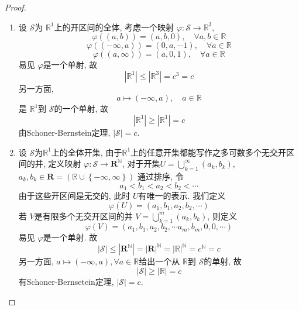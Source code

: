 \documentclass[../main.tex]{subfiles}
\begin{document}
\begin{proof}
    \begin{enumerate}
        \item 设 \(  \mathcal{S}  \)为 \(  \mathbb{R} ^{1}  \)上的开区间的全体, 考虑一个映射 \(   \varphi :\mathcal{S}\to \mathbb{R} ^{3}  \), \[
         \varphi \left( \left( a,b \right)  \right)= \left( a,b,0 \right),\quad \forall a,b\in \mathbb{R}   
        \]    \[
         \varphi \left( \left( -\infty,a  \right) \right)= \left( 0, a,-1 \right),\quad \forall a \in \mathbb{R}   
        \] \[
         \varphi \left(\left(  a, \infty \right)  \right)= \left( a,0 ,1 \right) ,\quad \forall  a \in \mathbb{R}  
        \]易见 \(   \varphi   \)是一个单射, 故 \[
        \left| \mathbb{R} ^{1} \right|\le \left| \mathbb{R} ^{3} \right|= c^{3}= c  
        \] 另一方面,  \[
        a\mapsto  \left( -\infty,a \right),\quad a\in \mathbb{R}  
        \]是 \(  \mathbb{R} ^{1}  \)到 \(  \mathcal{S}  \)的一个单射, 故 \[
        \left| \mathbb{R} ^{1} \right|\ge \left| \mathbb{R} ^{1}\right|= c  
        \]  由Schoner-Bernstein定理, \(  \left| \mathcal{S} \right|= c   \).
        
        \item 设 \(  \mathcal{S}  \)为\(  \mathbb{R} ^{1}  \)上的全体开集,    由于\(  \mathbb{R} ^{1}  \)上的任意开集都能写作之多可数多个无交开区间的并, 定义映射 \(   \varphi :   \mathcal{S}\to \mathbf{R} ^{\mathbb{N} }\),  对于开集\(  U= \bigcup _{k= 1}^{\infty} \left( a_{k}, b_{k} \right)  \), \(  a_{k},b_{k}\in \mathbf{R}= \left( \mathbb{R} \cup \left\{ -\infty,\infty \right\} \right)   \)  通过排序, 令 \[
        a_1< b_1< a_2< b_2< \cdots 
        \]由于这些开区间是无交的, 此时 \(  U  \)有唯一的表示. 我们定义 \[
         \varphi \left( U \right)= \left( a_1,b_1, a_2,b_2,\cdots   \right)  
        \]    若 \(  V  \)是有限多个无交开区间的并 \(  V= \bigcup _{k= 1}^{m}\left( a_{k},b_{k} \right)   \), 则定义 \[
         \varphi \left( V \right)= \left( a_1,b_1, a_2,b_2,\cdots  a_{m},b_{m},0,0,\cdots \right)  
        \]  易见 \(   \varphi   \)是一个单射. 故 \[
        \left| \mathcal{S} \right|\le  \left| \mathbf{R}^{\mathbb{N} } \right|= \left| \mathbf{R} \right|^{\mathbb{N} }= \left| \mathbb{R}  \right|^{\mathbb{N} }= c^{\mathbb{N} }= c    
        \] 另一方面,  \(  a\mapsto  \left( -\infty,a \right), \forall a \in \mathbb{R}    \)给出一个从 \(  \mathbb{R}   \)到 \(  \mathcal{S}  \)的单射, 故 \[
        \left| \mathcal{S} \right|\ge \left| \mathbb{R}  \right|= c  
        \]   有Schoner-Bernsetein定理, \(  \left| \mathcal{S} \right|= c   \). 
    \end{enumerate}
    
\end{proof}
\end{document}
